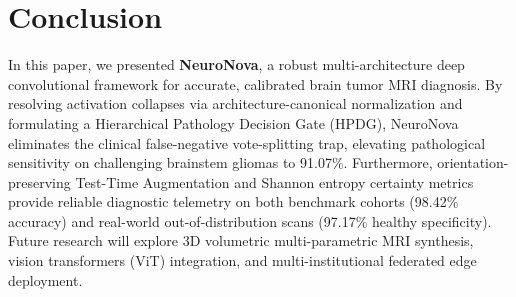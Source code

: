 \documentclass[runningheads]{llncs}
\begin{document}
\section{Conclusion}
In this paper, we presented \textbf{NeuroNova}, a robust multi-architecture deep convolutional framework for accurate, calibrated brain tumor MRI diagnosis. By resolving activation collapses via architecture-canonical normalization and formulating a Hierarchical Pathology Decision Gate (HPDG), NeuroNova eliminates the clinical false-negative vote-splitting trap, elevating pathological sensitivity on challenging brainstem gliomas to 91.07\%. Furthermore, orientation-preserving Test-Time Augmentation and Shannon entropy certainty metrics provide reliable diagnostic telemetry on both benchmark cohorts (98.42\% accuracy) and real-world out-of-distribution scans (97.17\% healthy specificity). Future research will explore 3D volumetric multi-parametric MRI synthesis, vision transformers (ViT) integration, and multi-institutional federated edge deployment.
\end{document}
